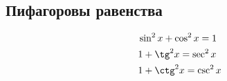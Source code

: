 \subsection*{Пифагоровы равенства}

\begin{align*}
  &\sin^2 x + \cos^2 x = 1 \\
  &1 + \tg^2 x = \sec^2 x \\
  &1 + \ctg^2 x = \csc^2 x
\end{align*}
